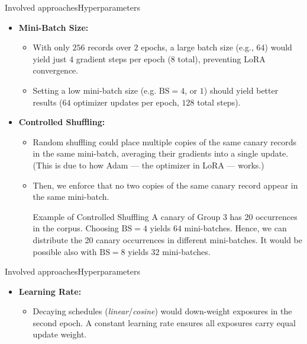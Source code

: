 \documentclass[10pt,aspectratio=43
	]{beamer}
\begin{document}
    \begin{frame}{Involved approaches}{Hyperparameters}
        \begin{itemize}
            \item \textbf{Mini-Batch Size:}
            \begin{itemize}
                \item With only $256$ records over $2$ epochs, a large batch size (e.g., $64$) would yield just $4$ gradient steps per epoch ($8$ total), preventing LoRA convergence.
                \item Setting a low mini-batch size (e.g. $\text{BS} = 4$, or $1$) should yield better results ($64$ optimizer updates per epoch, $128$ total steps).
            \end{itemize}
            \item \textbf{Controlled Shuffling:}
            \begin{itemize}
                \item Random shuffling could place multiple copies of the same canary records in the same mini-batch, averaging their gradients into a single update. (This is due to how Adam --- the optimizer in LoRA --- works.)
                \item Then, we enforce that no two copies of the same canary record appear in the same mini-batch.
                    \begin{exampleblock}{Example of Controlled Shuffling}
                    A canary of Group 3 has 20 occurrences in the corpus. Choosing $\text{BS} = 4$ yields $64$ mini-batches. Hence, we can distribute the 20 canary occurrences in different mini-batches.
                    It would be possible also with $\text{BS} = 8$ yields $32$ mini-batches.
                \end{exampleblock}
            \end{itemize}
        \end{itemize}
    \end{frame}


    \begin{frame}{Involved approaches}{Hyperparameters}
        \begin{itemize}
            \item \textbf{Learning Rate:}
            \begin{itemize}
                \item Decaying schedules (\emph{linear}/\emph{cosine}) would down-weight exposures in the second epoch. A constant learning rate ensures all exposures carry equal update weight.
            \end{itemize}
        \end{itemize}
    \end{frame}
\end{document}
